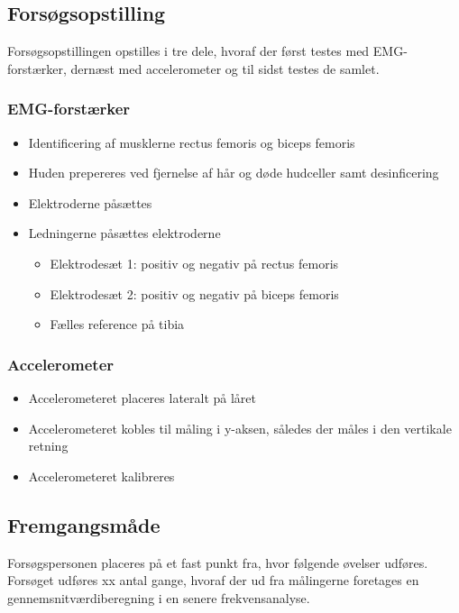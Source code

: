 \subsection{Forsøgsopstilling}
Forsøgsopstillingen opstilles i tre dele, hvoraf der først testes med EMG-forstærker, dernæst med accelerometer og til sidst testes de samlet. 

\subsubsection{EMG-forstærker}
\begin{itemize}
\item Identificering af musklerne rectus femoris og biceps femoris 
\item Huden prepereres ved fjernelse af hår og døde hudceller samt desinficering 
\item Elektroderne påsættes
\item Ledningerne påsættes elektroderne
	\begin{itemize}
	\item Elektrodesæt 1: positiv og negativ på rectus femoris
	\item Elektrodesæt 2: positiv og negativ på biceps femoris
	\item Fælles reference på tibia
	\end{itemize} 
\end{itemize}

\subsubsection{Accelerometer}
\begin{itemize}
\item Accelerometeret placeres lateralt på låret
\item Accelerometeret kobles til måling i y-aksen, således der måles i den vertikale retning
\item Accelerometeret kalibreres
\end{itemize}

\subsection{Fremgangsmåde}
 Forsøgspersonen placeres på et fast punkt fra, hvor følgende øvelser udføres. Forsøget udføres xx antal gange, hvoraf der ud fra målingerne foretages en gennemsnitværdiberegning i en senere frekvensanalyse.


